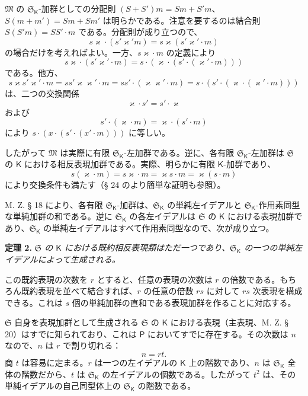 $\mathfrak M$ の $\mathfrak S_{\mathsf K}$-加群としての分配則 $(S+S')m=Sm+S'm$、$S(m+m')=Sm+Sm'$ は明らかである。注意を要するのは結合則 $S(S'm)=SS'\cdot m$ である。分配則が成り立つので、
\[
s\varkappa \cdot(s'\varkappa ' m)=s\varkappa (s'\varkappa '\cdot m)
\]
の場合だけを考えればよい。一方、$s\varkappa \cdot m$ の定義により
\[
s\varkappa \cdot(s'\varkappa '\cdot m)=s\cdot(\varkappa \cdot(s'\cdot(\varkappa '\cdot m)))
\]
である。他方、
\[
s\varkappa  s'\varkappa '\cdot m=ss'\varkappa \varkappa '\cdot m=ss'\cdot(\varkappa \varkappa '\cdot m)
=s\cdot(s'\cdot(\varkappa \cdot(\varkappa '\cdot m)))
\]
は、二つの交換関係
\[
\varkappa \cdot s'=s'\cdot \varkappa
\]
および
\[
s'\cdot(\varkappa \cdot m)=\varkappa \cdot(s'\cdot m)
\]
により $s\cdot(x\cdot(s'\cdot(x'\cdot m)))$ に等しい。

したがって $\mathfrak M$ は実際に有限 $\mathfrak S_{\mathsf K}$-左加群である。逆に、各有限 $\mathfrak S_{\mathsf K}$-左加群は $\mathfrak S$ の $\mathsf K$ における相反表現加群である。実際、明らかに有限 $\mathsf K$-加群であり、
\[
s(\varkappa \cdot m)=s\varkappa \cdot m=\varkappa s\cdot m=\varkappa (s\cdot m)
\]
により交換条件も満たす（§ 24 のより簡単な証明も参照）。

M. Z. § 18 により、各有限 $\mathfrak S_{\mathsf K}$-加群は、$\mathfrak S_{\mathsf K}$ の単純左イデアルと $\mathfrak S_{\mathsf K}$-作用素同型な単純加群の和である。逆に $\mathfrak S_{\mathsf K}$ の各左イデアルは $\mathfrak S$ の $\mathsf K$ における表現加群であり、$\mathfrak S_{\mathsf K}$ の単純左イデアルはすべて作用素同型なので、次が成り立つ。

\textbf{定理 2.} \emph{$\mathfrak S$ の $\mathsf K$ における既約相反表現類はただ一つであり、$\mathfrak S_{\mathsf K}$ の一つの単純左イデアルによって生成される。}

この既約表現の次数を $r$ とすると、任意の表現の次数は $r$ の倍数である。もちろん既約表現を並べて結合すれば、$r$ の任意の倍数 $rs$ に対して $rs$ 次表現を構成できる。これは $s$ 個の単純加群の直和である表現加群を作ることに対応する。

$\mathfrak S$ 自身を表現加群として生成される $\mathfrak S$ の $\mathsf K$ における表現（主表現、M. Z. § 20）はすでに知られており、これは $\mathsf P$ においてすでに存在する。その次数は $n$ なので、$n$ は $r$ で割り切れる：
\[
n=rt.
\]
商 $t$ は容易に定まる。$r$ は一つの左イデアルの $\mathsf K$ 上の階数であり、$n$ は $\mathfrak S_{\mathsf K}$ 全体の階数だから、$t$ は $\mathfrak S_{\mathsf K}$ の左イデアルの個数である。したがって $t^2$ は、その単純イデアルの自己同型体上の $\mathfrak S_{\mathsf K}$ の階数である。

